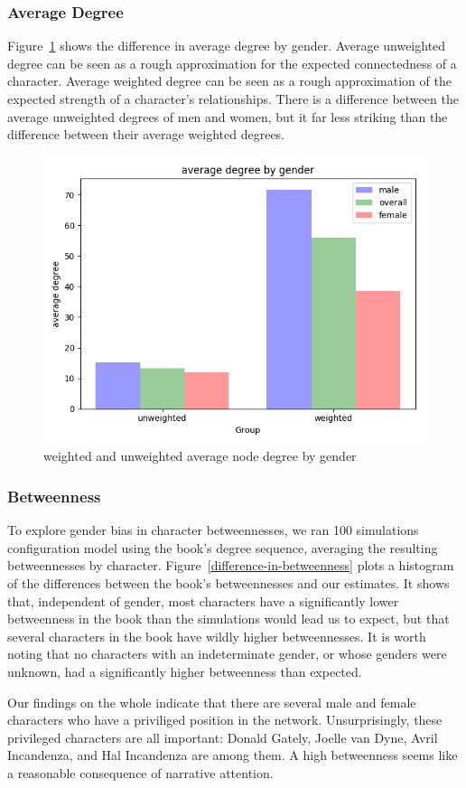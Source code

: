 \subsubsection{Average Degree}
Figure~\ref{average-node-degree-by-gender} shows the difference in average degree by gender. Average unweighted degree can be seen as a rough approximation for the expected connectedness of a character. Average weighted degree can be seen as a rough approximation of the expected strength of a character's relationships. There is a difference between the average unweighted degrees of men and women, but it far less striking than the difference between their average weighted degrees. 

\begin{figure}[ht!]
    \centering
    \includegraphics[width=.4 \textwidth]{images/gender_degrees.png}
    \caption{weighted and unweighted average node degree by gender}
    \label{average-node-degree-by-gender}
\end{figure}

\subsubsection{Betweenness}
To explore gender bias in character betweennesses, we ran 100 simulations configuration model using the book's degree sequence, averaging the resulting betweennesses by character. Figure~\ref{difference-in-betweenness} plots a histogram of the differences between the book's betweennesses and our estimates. It shows that, independent of gender, most characters have a significantly lower betweenness in the book than the simulations would lead us to expect, but that several characters in the book have wildly higher betweennesses. It is worth noting that no characters with an indeterminate gender, or whose genders were unknown, had a significantly higher betweenness than expected.

Our findings on the whole indicate that there are several male and female characters who have a priviliged position in the network. Unsurprisingly, these privileged characters are all important: Donald Gately, Joelle van Dyne, Avril Incandenza, and Hal Incandenza are among them. A high betweenness seems like a reasonable consequence of narrative attention.
   
